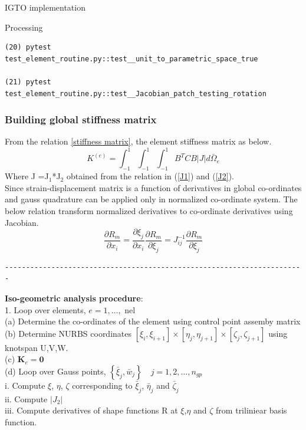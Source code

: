 \documentclass[a4paper,12pt,times]{article}
\begin{document}
\begin{section}{IGTO implementation}
\begin{subsection}{Processing}
\begin{lstlisting}
(20) pytest test_element_routine.py::test__unit_to_parametric_space_true

(21) pytest test_element_routine.py::test__Jacobian_patch_testing_rotation

\end{lstlisting}
\subsubsection{Building global stiffness matrix}
From the relation \ref{stiffness matrix}, the element stiffness matrix as below.
\begin{equation}
K^{(e)}=\int_{-1}^{1} \int_{-1}^{1} \int_{-1}^{1} B^{T} C B|J| d \bar{\Omega}_{e}
\end{equation}
Where J =J${_1}$*J${_2}$ obtained from the relation in (\ref{J1}) and (\ref{J2}).\\
Since strain-displacement matrix is a function of derivatives in global co-ordinates and gauss quadrature can be applied only in normalized co-ordinate system. The below relation transform normalized derivatives to co-ordinate derivatives using Jacobian.
\begin{equation}
\frac{\partial R_{m}}{\partial x_{i}}=\frac{\partial \xi_{j}}{\partial x_{i}} \frac{\partial R_{m}}{\partial \xi_{j}}=J_{i j}^{-1} \frac{\partial R_{m}}{\partial \xi_{j}}
\end{equation}
\begin{verbatim}
-----------------------------------------------------------------------
\end{verbatim}
\textbf{Iso-geometric analysis procedure}:\\
1. Loop over elements, $e=1, \ldots,$ nel\\
(a) Determine the co-ordinates of the element using control point assemby matrix\\
(b)  Determine NURBS coordinates $\left[\xi_{i}, \xi_{i+1}\right] \times\left[\eta_{j}, \eta_{j+1}\right] \times\left[\zeta_{j}, \zeta_{j+1}\right]$ using knotspan U,V,W.\\
(c) $\mathbf{K}_{e}=\mathbf{0}$\\
(d) Loop over Gauss points, $\left\{\bar{\xi}_{j}, \bar{w}_{j}\right\} \quad j=1,2, \ldots, n_{g p}$\\
i. Compute $\xi$, $\eta$, $\zeta$   corresponding to $\bar{\xi}_{j}$, $\bar{\eta}_{j}$ and  $\bar{\zeta}_{j}$  \\
ii. Compute $\left|J_{2}\right|$ \\
iii. Compute derivatives of shape functions R at $\xi$,$\eta$ and $\zeta$ from triliniear basis function.\\

\end{subsection}
\end{section}
\end{document}
